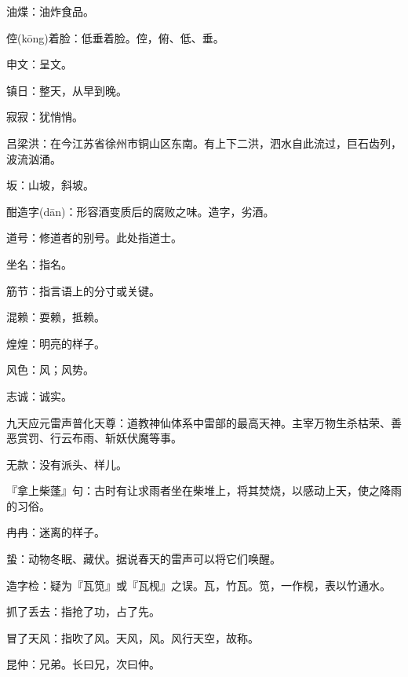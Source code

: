\startbuffer[1460]
油煠：油炸食品。
\stopbuffer


\startbuffer[1461]
倥(kōng)着脸：低垂着脸。倥，俯、低、垂。
\stopbuffer


\startbuffer[1462]
申文：呈文。
\stopbuffer


\startbuffer[1463]
镇日：整天，从早到晚。
\stopbuffer


\startbuffer[1464]
寂寂：犹悄悄。
\stopbuffer


\startbuffer[1465]
吕梁洪：在今江苏省徐州市铜山区东南。有上下二洪，泗水自此流过，巨石齿列，波流汹涌。
\stopbuffer


\startbuffer[1466]
坂：山坡，斜坡。
\stopbuffer


\startbuffer[1467]
酣造字(dān)：形容酒变质后的腐败之味。造字，劣酒。
\stopbuffer


\startbuffer[1468]
道号：修道者的别号。此处指道士。
\stopbuffer


\startbuffer[1469]
坐名：指名。
\stopbuffer


\startbuffer[1470]
筋节：指言语上的分寸或关键。
\stopbuffer


\startbuffer[1471]
混赖：耍赖，抵赖。
\stopbuffer


\startbuffer[1472]
煌煌：明亮的样子。
\stopbuffer


\startbuffer[1473]
风色：风；风势。
\stopbuffer


\startbuffer[1474]
志诚：诚实。
\stopbuffer


\startbuffer[1475]
九天应元雷声普化天尊：道教神仙体系中雷部的最高天神。主宰万物生杀枯荣、善恶赏罚、行云布雨、斩妖伏魔等事。
\stopbuffer


\startbuffer[1476]
无款：没有派头、样儿。
\stopbuffer


\startbuffer[1477]
『拿上柴蓬』句：古时有让求雨者坐在柴堆上，将其焚烧，以感动上天，使之降雨的习俗。
\stopbuffer


\startbuffer[1478]
冉冉：迷离的样子。
\stopbuffer


\startbuffer[1479]
蛰：动物冬眠、藏伏。据说春天的雷声可以将它们唤醒。
\stopbuffer


\startbuffer[1480]
造字检：疑为『瓦笕』或『瓦枧』之误。瓦，竹瓦。笕，一作枧，表以竹通水。
\stopbuffer


\startbuffer[1481]
抓了丢去：指抢了功，占了先。
\stopbuffer


\startbuffer[1482]
冒了天风：指吹了风。天风，风。风行天空，故称。
\stopbuffer


\startbuffer[1483]
昆仲：兄弟。长曰兄，次曰仲。
\stopbuffer


